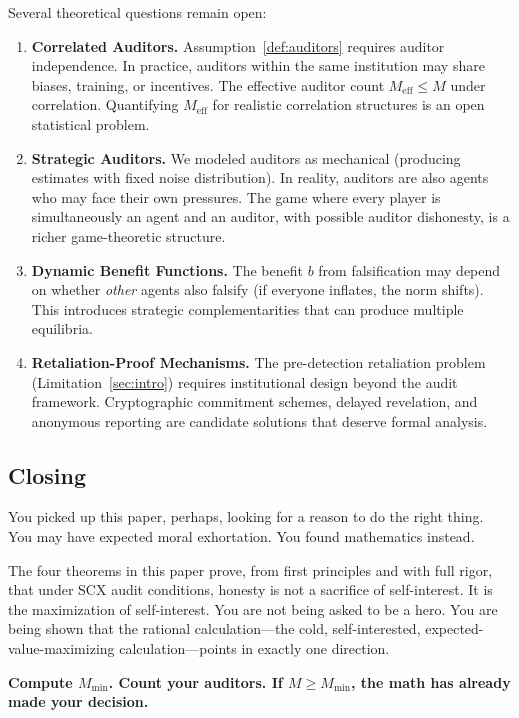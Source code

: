 \documentclass[11pt,a4paper]{article}
\theoremstyle{definition}
\theoremstyle{remark}
\newcommand{\SCX}{\textsc{SCX}}
\begin{document}
Several theoretical questions remain open:

\begin{enumerate}[label=(\roman*)]
    \item \textbf{Correlated Auditors.} Assumption~\ref{def:auditors} requires auditor independence. In practice, auditors within the same institution may share biases, training, or incentives. The effective auditor count $M_{\text{eff}} \leq M$ under correlation. Quantifying $M_{\text{eff}}$ for realistic correlation structures is an open statistical problem.
    \item \textbf{Strategic Auditors.} We modeled auditors as mechanical (producing estimates with fixed noise distribution). In reality, auditors are also agents who may face their own pressures. The game where every player is simultaneously an agent and an auditor, with possible auditor dishonesty, is a richer game-theoretic structure.
    \item \textbf{Dynamic Benefit Functions.} The benefit $b$ from falsification may depend on whether \emph{other} agents also falsify (if everyone inflates, the norm shifts). This introduces strategic complementarities that can produce multiple equilibria.
    \item \textbf{Retaliation-Proof Mechanisms.} The pre-detection retaliation problem (Limitation~\ref{sec:intro}) requires institutional design beyond the audit framework. Cryptographic commitment schemes, delayed revelation, and anonymous reporting are candidate solutions that deserve formal analysis.
\end{enumerate}

\subsection{Closing }

You picked up this paper, perhaps, looking for a reason to do the right thing. You may have expected moral exhortation. You found mathematics instead.

The four theorems in this paper prove, from first principles and with full rigor, that under \SCX{} audit conditions, honesty is not a sacrifice of self-interest. It is the maximization of self-interest. You are not being asked to be a hero. You are being shown that the rational calculation---the cold, self-interested, expected-value-maximizing calculation---points in exactly one direction.

\textbf{Compute $M_{\min}$. Count your auditors. If $M \geq M_{\min}$, the math has already made your decision.}
\end{document}

